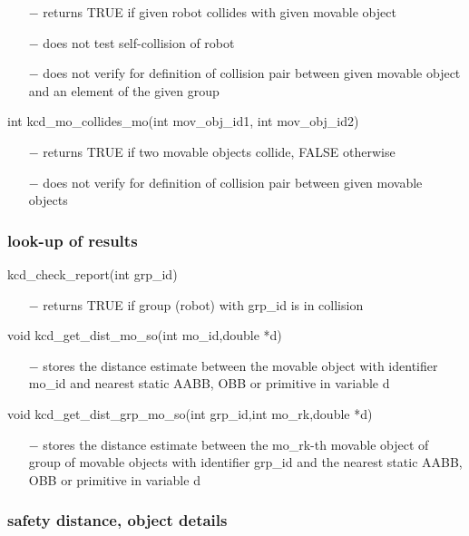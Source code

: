 \begin{itemize}
\item[$-$] returns TRUE if given robot collides with given movable object
\item[$-$] does not test self-collision of robot
\item[$-$] does not verify for definition of collision pair between given
  movable object and an element of the given group
\end{itemize}
int kcd\_mo\_collides\_mo(int mov\_obj\_id1, int mov\_obj\_id2)
\begin{itemize}
\item[$-$] returns TRUE if two movable objects collide, FALSE otherwise
\item[$-$] does not verify for definition of collision pair between given
  movable objects
\end{itemize}
\subsubsection{look-up of results}

kcd\_check\_report(int grp\_id) 
\begin{itemize}
\item[$-$] returns TRUE if group (robot) with grp\_id is in collision 
\end{itemize}
void kcd\_get\_dist\_mo\_so(int mo\_id,double *d)
\begin{itemize}
\item[$-$] stores the distance estimate between the movable object with
  identifier mo\_id and nearest static AABB, OBB or primitive 
  in variable d
\end{itemize}
void kcd\_get\_dist\_grp\_mo\_so(int grp\_id,int mo\_rk,double *d)
\begin{itemize}
\item[$-$] stores the distance estimate between the mo\_rk-th movable object
  of group of movable objects with identifier grp\_id and the nearest
  static AABB, OBB or primitive in variable d
\end{itemize}

\subsubsection{safety distance, object details}

